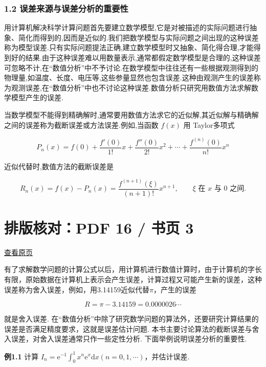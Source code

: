 \documentclass[
  10pt,
  a4paper,
]{article}
\begin{document}
\subsubsection{1.2
误差来源与误差分析的重要性}\label{ux8befux5deeux6765ux6e90ux4e0eux8befux5deeux5206ux6790ux7684ux91cdux8981ux6027}

用计算机解决科学计算问题首先要建立数学模型,它是对被描述的实际问题进行抽象、简化而得到的,因而是近似的.我们把数学模型与实际问题之间出现的这种误差称为模型误差.只有实际问题提法正确,建立数学模型时又抽象、简化得合理,才能得到好的结果.由于这种误差难以用数量表示,通常都假定数学模型是合理的,这种误差可忽略不计,在``数值分析''中不予讨论.在数学模型中往往还有一些根据观测得到的物理量,如温度、长度、电压等,这些参量显然也包含误差.这种由观测产生的误差称为观测误差,在``数值分析''中也不讨论这种误差.数值分析只研究用数值方法求解数学模型产生的误差.

当数学模型不能得到精确解时,通常要用数值方法求它的近似解,其近似解与精确解之间的误差称为截断误差或方法误差.例如,当函数
\(f(x)\) 用 Taylor多项式

\[
P_n(x)=f(0)+\frac{f'(0)}{1!}x+\frac{f''(0)}{2!}x^2+\cdots+\frac{f^{(n)}(0)}{n!}x^n
\]

近似代替时,数值方法的截断误差是

\[
R_n(x)=f(x)-P_n(x)=\frac{f^{(n+1)}(\xi)}{(n+1)!}x^{n+1},\qquad \xi\text{ 在 }x\text{ 与 }0\text{ 之间}.
\]

\newpage

\section{排版核对：PDF 16 / 书页
3}\label{ux6392ux7248ux6838ux5bf9pdf-16-ux4e66ux9875-3}

\href{../../../source-images/pdf-016.jpeg}{查看原页}

有了求解数学问题的计算公式以后，用计算机进行数值计算时，由于计算机的字长有限，原始数据在计算机上表示会产生误差，计算过程又可能产生新的误差，这种误差称为舍入误差，例如，用3.14159近似代替\(\pi\)，产生的误差

\[
R = \pi - 3.14159 = 0.0000026\cdots
\]

就是舍入误差.
在``数值分析''中除了研究数学问题的算法外，还要研究计算结果的误差是否满足精度要求，这就是误差估计问题.
本书主要讨论算法的截断误差与舍入误差，对舍入误差通常只作一些定性分析.
下面举例说明误差分析的重要性.

\textbf{例1.1} 计算
\(I_n = \mathrm{e}^{-1} \int_{0}^{1} x^n \mathrm{e}^{x} \mathrm{d}x (n = 0,1,\cdots)\)，并估计误差.
\end{document}
